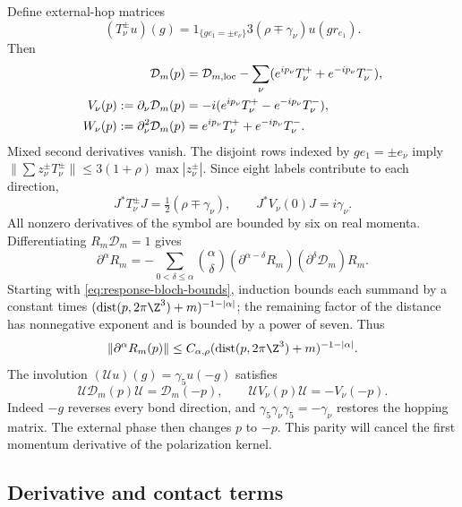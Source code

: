 \documentclass[11pt,letterpaper,reqno]{amsart}
\begin{document}
Define external-hop matrices
\[
 (T_\nu^\pm u)(g)=1_{\{ge_1=\pm e_\nu\}}
                          3(\rho\mp\gamma_\nu)u(gr_{e_1}).
\]
Then
\begin{align}\label{eq:response-symbol-vertices}
 \mathcal D_m(p)&=\mathcal D_{m,\mathrm{loc}}
       -\sum_\nu(e^{ip_\nu}T_\nu^++e^{-ip_\nu}T_\nu^-),\notag\\
 V_\nu(p):=\partial_\nu\mathcal D_m(p)
       &=-i(e^{ip_\nu}T_\nu^+-e^{-ip_\nu}T_\nu^-),\notag\\
 W_\nu(p):=\partial_\nu^2\mathcal D_m(p)
       &=e^{ip_\nu}T_\nu^++e^{-ip_\nu}T_\nu^-.
\end{align}
Mixed second derivatives vanish. The disjoint rows indexed
by $ge_1=\pm e_\nu$ imply
$\|\sum z_\nu^\pm T_\nu^\pm\|\le3(1+\rho)\max|z_\nu^\pm|$.
Since eight labels contribute to each direction,
\begin{equation}\label{eq:response-light-vertex}
 J^*T_\nu^\pm J=\tfrac12(\rho\mp\gamma_\nu),\qquad
 J^*V_\nu(0)J=i\gamma_\nu.
\end{equation}
All nonzero derivatives of the symbol are bounded by six
on real momenta. Differentiating $R_m\mathcal D_m=1$ gives
\[
 \partial^\alpha R_m=-\sum_{0<\delta\le\alpha}
   \binom\alpha\delta(\partial^{\alpha-\delta}R_m)
                    (\partial^\delta\mathcal D_m)R_m.
\]
Starting with \eqref{eq:response-bloch-bounds}, induction bounds
each summand by a constant times
$(\operatorname{dist}(p,2\pi\Z^3)+m)^{-1-|\alpha|}$;
the remaining factor of the distance has nonnegative exponent
and is bounded by a power of seven. Thus
\begin{equation}\label{eq:response-inverse-derivatives}
 \|\partial^\alpha R_m(p)\|
   \le C_{\alpha,\rho}
       (\operatorname{dist}(p,2\pi\Z^3)+m)^{-1-|\alpha|}.
\end{equation}
The involution $(\mathcal Uu)(g)=\gamma_5u(-g)$ satisfies
\begin{equation}\label{eq:response-bloch-parity}
 \mathcal U\mathcal D_m(p)\mathcal U=\mathcal D_m(-p),\qquad
 \mathcal UV_\nu(p)\mathcal U=-V_\nu(-p).
\end{equation}
Indeed $-g$ reverses every bond direction, and
$\gamma_5\gamma_\nu\gamma_5=-\gamma_\nu$ restores the
hopping matrix. The external phase then changes $p$ to
$-p$. This parity will cancel the first momentum derivative
of the polarization kernel.

\subsection{Derivative and contact terms}\label{subsec:response-contact}
\end{document}

